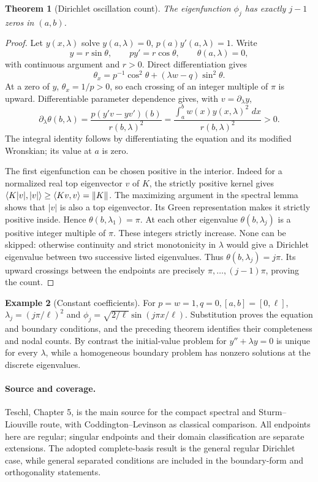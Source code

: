 \documentclass[11pt,oneside]{book}
\newtheorem{theorem}{Theorem}[chapter]
\theoremstyle{definition}
\newtheorem{example}[theorem]{Example}
\theoremstyle{remark}\newtheorem{remark}[theorem]{Remark}
\newcommand{\dd}{\,d}\newcommand{\id}{\operatorname{id}}
\begin{document}
\begin{theorem}[Dirichlet oscillation count]\label{d13:10:oscillation}
The eigenfunction \(\phi_j\) has exactly \(j-1\) zeros in \((a,b)\).
\end{theorem}
\begin{proof}
Let \(y(x,\lambda)\) solve \(y(a,\lambda)=0\), \(p(a)y'(a,\lambda)=1\).
Write
\[
 y=r\sin\theta,\qquad py'=r\cos\theta,\qquad \theta(a,\lambda)=0,
\]
with continuous argument and \(r>0\). Direct differentiation gives
\[
 \theta_x=p^{-1}\cos^2\theta+(\lambda w-q)\sin^2\theta .
\]
At a zero of \(y\), \(\theta_x=1/p>0\), so each crossing of an integer
multiple of \(\pi\) is upward. Differentiable parameter dependence gives,
with \(v=\partial_\lambda y\),
\[
 \partial_\lambda\theta(b,\lambda)
 =\frac{p(y'v-yv')(b)}{r(b,\lambda)^2}
 =\frac{\int_a^bw(x)y(x,\lambda)^2\,\dd x}{r(b,\lambda)^2}>0.
\]
The integral identity follows by differentiating the equation and its
modified Wronskian; its value at \(a\) is zero.

The first eigenfunction can be chosen positive in the interior.
Indeed for a normalized real top eigenvector \(v\) of \(K\),
the strictly positive kernel gives
\(\langle K|v|,|v|\rangle\ge\langle Kv,v\rangle=\lVert K\rVert\).
The maximizing argument in the spectral lemma shows that \(|v|\) is
also a top eigenvector. Its Green representation makes it strictly
positive inside. Hence \(\theta(b,\lambda_1)=\pi\).
At each other eigenvalue \(\theta(b,\lambda_j)\) is a positive integer
multiple of \(\pi\). These integers strictly increase. None can be skipped:
otherwise continuity and strict monotonicity in \(\lambda\) would give a
Dirichlet eigenvalue between two successive listed eigenvalues. Thus
\(\theta(b,\lambda_j)=j\pi\). Its upward crossings between the endpoints
are precisely \(\pi,\ldots,(j-1)\pi\), proving the count.
\end{proof}

\begin{example}[Constant coefficients]\label{d13:10:dirichlet-example}
For \(p=w=1,q=0,[a,b]=[0,\ell]\),
\(\lambda_j=(j\pi/\ell)^2\) and
\(\phi_j=\sqrt{2/\ell}\sin(j\pi x/\ell)\).
Substitution proves the equation and boundary conditions, and the preceding
theorem identifies their completeness and nodal counts.
By contrast the initial-value problem for \(y''+\lambda y=0\) is unique for
every \(\lambda\), while a homogeneous boundary problem has nonzero
solutions at the discrete eigenvalues.
\end{example}

\paragraph{Source and coverage.}
Teschl, Chapter 5, is the main source for the compact spectral and
Sturm--Liouville route, with Coddington--Levinson as classical comparison.
All endpoints here are regular; singular endpoints and their domain
classification are separate extensions. The adopted complete-basis result
is the general regular Dirichlet case, while general separated conditions
are included in the boundary-form and orthogonality statements.
\end{document}

